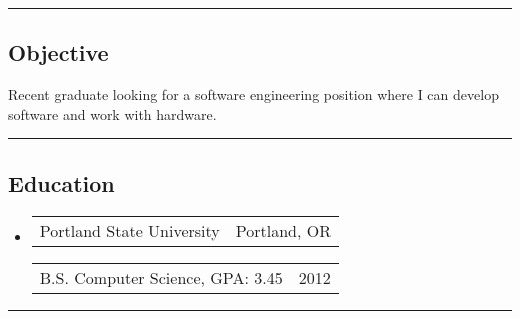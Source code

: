 \documentclass[10pt,letterpaper]{article}
\author{Eric Dinger}
\makeatletter
\newcommand{\heading}[2]
{\begin{tabular*}{\linewidth}{l@{\extracolsep{\fill}}r}
#1 &
#2 \\
\end{tabular*}}
\makeatother
\begin{document}
 \renewcommand*\arraystretch{1.5}


\hrule
\vspace{-.4em}

\subsection*{Objective}
Recent graduate looking for a software engineering position where I can develop software and work with hardware.\\

\vspace{.4em}
\hrule
\vspace{-.2em}

\subsection*{Education}
	\begin{itemize}
	\item
		\heading
			{Portland State University}
			{Portland, OR}

		\vspace{-1em}
		\heading 
			{ B.S. Computer Science, GPA: 3.45}
			{2012}
	\end{itemize}

\hrule
\end{document}
